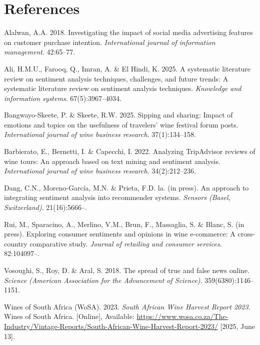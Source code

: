 \documentclass[11pt,preprint]{elsarticle}
\numberwithin{equation}{section}
\numberwithin{figure}{section}
\numberwithin{table}{section}
\newlength{\cslhangindent}
\newenvironment{CSLReferences}[2] %
{\begin{list}{}{%
	\setlength{\itemindent}{0pt}
	\setlength{\leftmargin}{0pt}
	\setlength{\parsep}{0pt}
	\ifodd #1
	\setlength{\leftmargin}{\cslhangindent}
	\setlength{\itemindent}{-1\cslhangindent}
	\fi
	\setlength{\itemsep}{#2\baselineskip}}}
{\end{list}}
\begin{document}
\newpage

\section*{References}\label{references}

\label{refs}
\begin{CSLReferences}{1}{1}
Alalwan, A.A. 2018. Investigating the impact of social media advertising
features on customer purchase intention. \emph{International journal of
information management}. 42:65--77.

Ali, H.M.U., Farooq, Q., Imran, A. \& El Hindi, K. 2025. A systematic
literature review on sentiment analysis techniques, challenges, and
future trends: A systematic literature review on sentiment analysis
techniques. \emph{Knowledge and information systems}. 67(5):3967--4034.

Bangwayo-Skeete, P. \& Skeete, R.W. 2025. Sipping and sharing: Impact of
emotions and topics on the usefulness of travelers' wine festival forum
posts. \emph{International journal of wine business research}.
37(1):134--158.

Barbierato, E., Bernetti, I. \& Capecchi, I. 2022. Analyzing TripAdvisor
reviews of wine tours: An approach based on text mining and sentiment
analysis. \emph{International journal of wine business research}.
34(2):212--236.

Dang, C.N., Moreno-García, M.N. \& Prieta, F.D. la. (in press). An
approach to integrating sentiment analysis into recommender systems.
\emph{Sensors (Basel, Switzerland)}. 21(16):5666--.

Rui, M., Sparacino, A., Merlino, V.M., Brun, F., Massaglia, S. \& Blanc,
S. (in press). Exploring consumer sentiments and opinions in wine
e-commerce: A cross-country comparative study. \emph{Journal of
retailing and consumer services}. 82:104097--.

Vosoughi, S., Roy, D. \& Aral, S. 2018. The spread of true and false
news online. \emph{Science (American Association for the Advancement of
Science)}. 359(6380):1146--1151.

Wines of South Africa (WoSA). 2023. \emph{South {A}frican {W}ine
{H}arvest {R}eport 2023}. Wines of South Africa. {[}Online{]},
Available:
\url{https://www.wosa.co.za/The-Industry/Vintage-Reports/South-African-Wine-Harvest-Report-2023/}
{[}2025, June 13{]}.

\end{CSLReferences}


\end{document}
